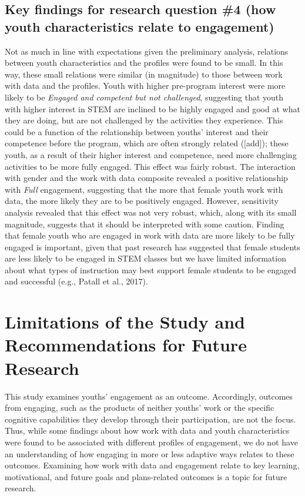 \documentclass[]{msu-thesis}
\theoremstyle{definition}
\theoremstyle{definition}
\theoremstyle{definition}
\theoremstyle{remark}
\begin{document}
\subsection{Key findings for research question \#4 (how youth
characteristics relate to
engagement)}\label{key-findings-for-research-question-4-how-youth-characteristics-relate-to-engagement}

Not as much in line with expectations given the preliminary analysis,
relations between youth characteristics and the profiles were found to
be small. In this way, these small relations were similar (in magnitude)
to those between work with data and the profiles. Youth with higher
pre-program interest were more likely to be \emph{Engaged and competent
but not challenged}, suggesting that youth with higher interest in STEM
are inclined to be highly engaged and good at what they are doing, but
are not challenged by the activities they experience. This could be a
function of the relationship between youths' interest and their
competence before the program, which are often strongly related
({[}add{]}); these youth, as a result of their higher interest and
competence, need more challenging activities to be more fully engaged.
This effect was fairly robust. The interaction with gender and the work
with data composite revealed a positive relationship with \emph{Full}
engagement, suggesting that the more that female youth work with data,
the more likely they are to be positively engaged. However, sensitivity
analysis revealed that this effect was not very robust, which, along
with its small magnitude, suggests that it should be interpreted with
some caution. Finding that female youth who are engaged in work with
data are more likely to be fully engaged is important, given that past
research has suggested that female students are less likely to be
engaged in STEM classes but we have limited information about what types
of instruction may best support female students to be engaged and
successful (e.g., Patall et al., 2017).

\section{Limitations of the Study and Recommendations for Future
Research}\label{limitations-of-the-study-and-recommendations-for-future-research}

This study examines youths' engagement as an outcome. Accordingly,
outcomes from engaging, such as the products of neither youths' work or
the specific cognitive capabilities they develop through their
participation, are not the focus. Thus, while some findings about how
work with data and youth characteristics were found to be associated
with different profiles of engagement, we do not have an understanding
of how engaging in more or less adaptive ways relates to these outcomes.
Examining how work with data and engagement relate to key learning,
motivational, and future goals and plans-related outcomes is a topic for
future research.
\end{document}

